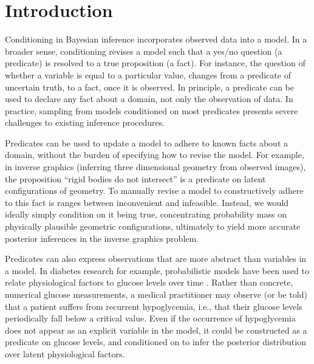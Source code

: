 
\section{Introduction}

Conditioning in Bayesian inference incorporates observed data into a model.
In a broader sense, conditioning revises a model such that a yes/no question (a predicate) is resolved to a true proposition (a fact).
For instance, the question of whether a variable is equal to a particular value, changes from a predicate of uncertain truth, to a fact, once it is observed.
In principle, a predicate can be used to declare any fact about a domain, not only the observation of data.
In practice, sampling from models conditioned on most predicates presents severe challenges to existing inference procedures.

Predicates can be used to update a model to adhere to known facts about a domain, without the burden of specifying how to revise the model.
For example, in inverse graphics \cite{marschner1998inverse,kulkarni2015deep} (inferring three dimensional geometry from observed images), the proposition ``rigid bodies do not intersect'' is a predicate on latent configurations of geometry.
To manually revise a model to constructively adhere to this fact is ranges between inconvenient and infeasible.
Instead, we would ideally simply condition on it being true, concentrating probability mass on physically plausible geometric configurations, ultimately to yield more accurate posterior inferences in the inverse graphics problem.

Predicates can also express observations that are more abstract than variables in a model.
In diabetes research for example, probabilistic models have been used to relate physiological factors to glucose levels over time \citep{levine2017offline,murata2004probabilistic}.
Rather than concrete, numerical glucose measurements, a medical practitioner may observe (or be told) that a patient suffers from recurrent hypoglycemia, i.e., that their glucose levels periodically fall below a critical value.
Even if the occurrence of hypoglycemia does not appear as an explicit variable in the model, it could be constructed as a predicate on glucose levels, and conditioned on to infer the posterior distribution over latent physiological factors.



